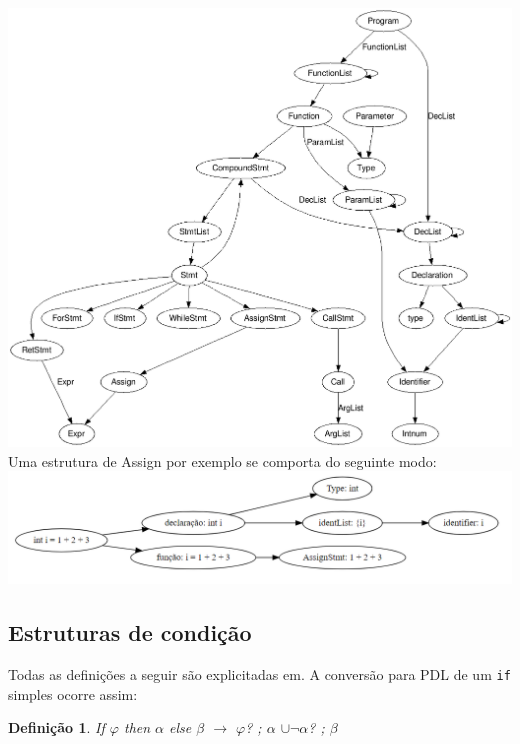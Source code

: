 \documentclass{article}
\newcommand\bruno[1]{({\color{red}#1})}
\newtheorem{definicao}{Definição}
\begin{document}
	\includegraphics[width=\textwidth]{Arvore}
	\\
	
	\BlankLine
	Uma estrutura de Assign por exemplo se comporta do seguinte modo:\\
	
	\includegraphics[width=\textwidth]{assignStmt}
	\BlankLine
	
	\subsection{Estruturas de condição} 
	Todas as definições a seguir são explicitadas em\cite{PDL}. 
	\BlankLine 
	\flushleft
	A conversão para PDL de um \texttt{if} simples ocorre assim: 
	\begin{definicao}%
		If $\varphi$ then $\alpha$ else $\beta$ $\rightarrow$ $\varphi$? ; $\alpha$ $\cup \neg\alpha$? ; $\beta$
	\end{definicao}
	
\end{document}
